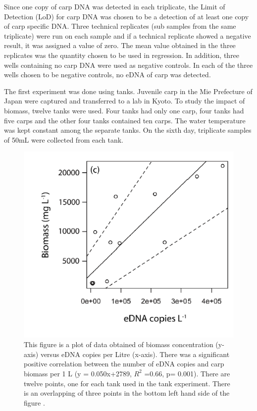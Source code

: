 \vspace{5mm}

Since one copy of carp DNA was detected in each triplicate, the Limit of Detection (LoD) for carp DNA was chosen to be a detection of at least one copy of carp specific DNA. Three technical replicates (sub samples from the same triplicate) were run on each sample and if a technical replicate showed a negative result, it was assigned a value of zero. The mean value obtained in the three replicates was the quantity chosen to be used in regression. In addition, three wells containing no carp DNA were used as negative controls. In each of the three wells chosen to be negative controls, no eDNA of carp was detected.

\vspace{5mm}

The first experiment was done using tanks. Juvenile carp in the Mie Prefecture of Japan were captured and transferred to a lab in Kyoto.
To study the impact of biomass, twelve tanks were used.  Four tanks had only one carp, four tanks had five carps and the other four tanks contained ten carps. The water temperature was kept constant among the separate tanks. On the sixth day, triplicate samples of 50mL were collected from each tank. 







\begin{figure}[H]
\includegraphics{Chapter2Images/eDNAcopies.png} 
\caption{This figure is a plot of data obtained of biomass concentration (y-axis) versus eDNA copies per Litre (x-axis). There was a
significant positive correlation between the number of eDNA
copies and carp biomass per 1 L (y = 0.050x+2789, $R^{2}$ =0.66,
p= 0.001). There are twelve points, one for each tank used in the tank experiment. There is an overlapping of three points in the bottom left hand side of the figure
 \citep{biomass}.}
\label{fig:copies}
\end{figure}


